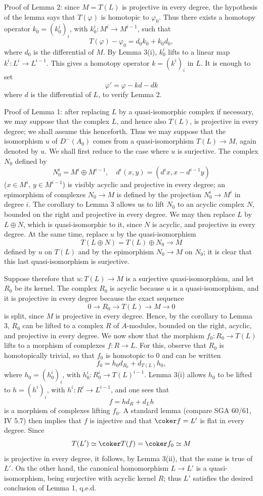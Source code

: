 Proof of Lemma 2: since $M=T(L)$ is projective in every degree, the hypothesis of the lemma says that $T(\varphi)$ is homotopic to $\varphi_0$. Thus there exists a homotopy operator $k_0=(k_0^i)_i$, with $k_0^i:M^i\to M^{i-1}$, such that
\[
T(\varphi)-\varphi_0=d_0k_0+k_0d_0,
\]
where $d_0$ is the differential of $M$. By Lemma 3(i), $k_0^i$ lifts to a linear map $k^i:L^i\to L^{i-1}$. This gives a homotopy operator $k=(k^i)_i$ in $L$. It is enough to set
\[
\varphi'=\varphi-kd-dk
\]
where $d$ is the differential of $L$, to verify Lemma 2.

Proof of Lemma 1: after replacing $L$ by a quasi-isomorphic complex if necessary, we may suppose that the complex $L$, and hence also $T(L)$, is projective in every degree; we shall assume this henceforth. Thus we may suppose that the isomorphism $u$ of $D^-(A_0)$ comes from a quasi-isomorphism $T(L)\to M$, again denoted by $u$. We shall first reduce to the case where $u$ is surjective. The complex $N_0$ defined by
\[
N_0^i=M^i\oplus M^{i-1},
\quad
 d^i(x,y)=(d^i x,x-d^{i-1}y)
\]
($x\in M^i$, $y\in M^{i-1}$) is visibly acyclic and projective in every degree; an epimorphism of complexes $N_0\to M$ is defined by the projection $N_0^i\to M^i$ in degree $i$. The corollary to Lemma 3 allows us to lift $N_0$ to an acyclic complex $N$, bounded on the right and projective in every degree. We may then replace $L$ by $L\oplus N$, which is quasi-isomorphic to it, since $N$ is acyclic, and projective in every degree. At the same time, replace $u$ by the quasi-isomorphism
\[
T(L\oplus N)=T(L)\oplus N_0\longrightarrow M
\]
defined by $u$ on $T(L)$ and by the epimorphism $N_0\to M$ on $N_0$; it is clear that this last quasi-isomorphism is surjective.

Suppose therefore that $u:T(L)\to M$ is a surjective quasi-isomorphism, and let $R_0$ be its kernel. The complex $R_0$ is acyclic because $u$ is a quasi-isomorphism, and it is projective in every degree because the exact sequence
\[
0\longrightarrow R_0\longrightarrow T(L)\longrightarrow M\longrightarrow0
\]
is split, since $M$ is projective in every degree. Hence, by the corollary to Lemma 3, $R_0$ can be lifted to a complex $R$ of $A$-modules, bounded on the right, acyclic, and projective in every degree. We now show that the morphism $f_0:R_0\to T(L)$ lifts to a morphism of complexes $f:R\to L$. For this, observe that $R_0$ is homotopically trivial, so that $f_0$ is homotopic to $0$ and can be written
\[
f_0=h_0d_{R_0}+d_{T(L)}h_0,
\]
where $h_0=(h_0^i)_i$, with $h_0^i:R_0^i\to T(L)^{i-1}$. Lemma 3(i) allows $h_0$ to be lifted to $h=(h^i)_i$, with $h^i:R^i\to L^{i-1}$, and one sees that
\[
f=hd_R+d_Lh
\]
is a morphism of complexes lifting $f_0$. A standard lemma (compare SGA 60/61, IV 5.7) then implies that $f$ is injective and that $\coker f=L'$ is flat in every degree. Since
\[
T(L')\simeq\coker T(f)=\coker f_0\simeq M
\]
is projective in every degree, it follows, by Lemma 3(ii), that the same is true of $L'$. On the other hand, the canonical homomorphism $L\to L'$ is a quasi-isomorphism, being surjective with acyclic kernel $R$; thus $L'$ satisfies the desired conclusion of Lemma 1, q.e.d.

